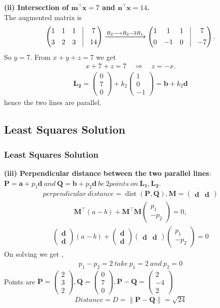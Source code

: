 \documentclass{beamer}
\theoremstyle{remark}
\providecommand{\norm}[1]{\lVert#1\rVert}
\newcommand{\myvec}[1]{\ensuremath{\begin{pmatrix}#1\end{pmatrix}}}
\let\vec\mathbf
\numberwithin{equation}{section}
\begin{document}
\begin{frame}
\textbf{(ii) Intersection of $\vec{m}^\top \vec{x}=7$ and $\vec{n}^\top \vec{x}=14$.}\\
The augmented matrix is
\begin{align}
\myvec
{1 & 1 & 1 &\vrule& 7\\[4pt]
3 & 2 & 3 &\vrule& 14} \xrightarrow{R_2 \longrightarrow R_2-3R_1}
\myvec
{1 & 1 & 1 &\vrule& 7\\[4pt]
0 & -1 & 0 &\vrule& -7}.
\end{align}
So  $y=7$. From $x+y+z=7$ we get
\begin{align}
x+7+z=7 \quad\Longrightarrow\quad z=-x.
\end{align}
\begin{align}
\vec{L_2} = \myvec{0\\7\\0} + k_2\myvec{1\\0\\-1} = \vec{b} + k_2 \vec{d}
\end{align}
 hence the two lines are parallel.
 

\end{frame}
\subsection{Least Squares Solution }
\begin{frame}
\frametitle{Least Squares Solution}

 \textbf{(iii) Perpendicular distance between the two parallel lines}:
 $\vec{P}=\vec{a}+p_1 \vec{d} \ and\ \vec{Q}=\vec{b}+p_2 \vec{d} \ be \ 2 points\ on\ \vec{L_1},\vec{L_2}. $
\begin{align} 
perpendicular\ distance = \operatorname{dist}(\vec{P},\vec{Q}) ,\vec{M}=\myvec{\vec{d} & \vec{d}} 
\end{align}
 \begin{align}
 \vec{M}^\top(a-b) + \vec{M}^\top\vec{M}\myvec{p_1\\-p_2} = 0 , 
 \end{align}
 \begin{align}
 \myvec{\vec{d}\\\vec{d}}(a-b) + \myvec{\vec{d}\\\vec{d}}\myvec{\vec{d}&\vec{d}}\myvec{p_1\\-p_2} = 0
 \end{align}
On solving we get , 
\begin{align}
p_1 - p_2 = 2 \ take \ p_1=2 \ and \ p_2=0
\end{align}
 Points are $\vec{P}=\myvec{2\\3\\2} , \vec{Q}=\myvec{0\\7\\0},\vec{P}-\vec{Q}=\myvec{2\\-4\\2}$
 \begin{align}
Distance = D= {\norm{\vec{P}-\vec{Q}}} = \sqrt{24} 
\end{align}
\end{frame}
\end{document}
